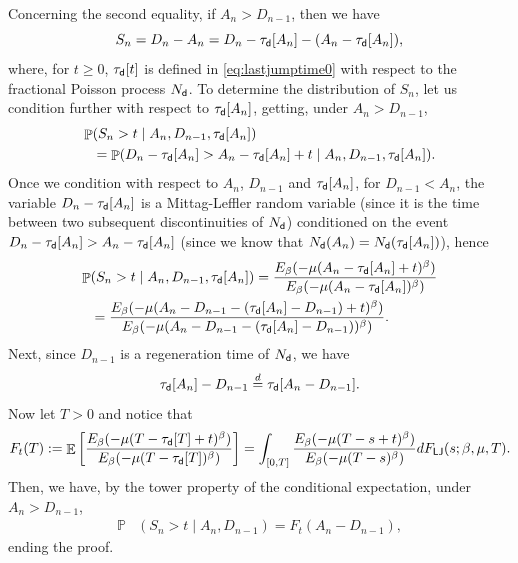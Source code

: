 \documentclass[]{amsart}
\numberwithin{equation}{section}
\theoremstyle{remark}
\theoremstyle{definition}
\DeclareMathOperator{\E}{\mathbb{E}}
\DeclareMathOperator{\N}{\mathbb{N}}
\DeclareMathOperator{\bP}{\mathbb{P}}
\begin{document}
	Concerning the second equality, if $A_n>D_{n-1}$, then we have
	\begin{equation*}
		S_n=D_n-A_n=D_n-\tau_{\sf d}[A_n]-(A_n-\tau_{\sf d}[A_n]),
	\end{equation*}
	where, for $t \ge 0$, $\tau_{\sf d}[t]$ is defined in \eqref{eq:lastjumptime0} with respect to the fractional Poisson process $N_{\sf d}$. To determine the distribution of $S_n$, let us condition further with respect to $\tau_{\sf d}[A_n]$, getting, under $A_n>D_{n-1}$, 
	\begin{align*}
		\bP&(S_n>t \mid A_n,D_{n-1},\tau_{\sf d}[A_n])\\
		&=\bP(D_n-\tau_{\sf d}[A_n]>A_n-\tau_{\sf d}[A_n]+t \mid A_n,D_{n-1},\tau_{\sf d}[A_n]).
	\end{align*}
	Once we condition with respect to $A_n$, $D_{n-1}$ and $\tau_{\sf d}[A_n]$, for $D_{n-1}<A_n$, the variable $D_n-\tau_{\sf d}[A_n]$ is a Mittag-Leffler random variable (since it is the time between two subsequent discontinuities of $N_{\sf d}$) conditioned on the event $D_n-\tau_{\sf d}[A_n]>A_n-\tau_{\sf d}[A_n]$ (since we know that $N_{\sf d}(A_n)=N_{\sf d}(\tau_{\sf d}[A_n])$), hence
	\begin{align*}
		\bP&(S_n>t \mid A_n,D_{n-1},\tau_{\sf d}[A_n])=\frac{E_\beta(-\mu(A_n-\tau_{\sf d}[A_n]+t)^\beta)}{E_\beta(-\mu(A_n-\tau_{\sf d}[A_n])^\beta)}\\
		&=\frac{E_\beta(-\mu(A_n-D_{n-1}-(\tau_{\sf d}[A_n]-D_{n-1})+t)^\beta)}{E_\beta(-\mu(A_n-D_{n-1}-(\tau_{\sf d}[A_n]-D_{n-1}))^\beta)}.
	\end{align*}
	Next, since $D_{n-1}$ is a regeneration time of $N_{\sf d}$, we have
	\begin{equation*}
		\tau_{\sf d}[A_n]-D_{n-1}\overset{d}{=}\tau_{\sf d}[A_n-D_{n-1}].
	\end{equation*}
	Now let $T>0$ and notice that
	\begin{equation*}
		F_t(T):=\E\left[\frac{E_\beta(-\mu(T-\tau_{\sf d}[T]+t)^\beta)}{E_\beta(-\mu(T-\tau_{\sf d}[T])^\beta)}\right]=\int_{[0,T]}\frac{E_\beta(-\mu(T-s+t)^\beta)}{E_\beta(-\mu(T-s)^\beta)}dF_{\sf LJ}(s;\beta,\mu,T).
	\end{equation*}
	Then, we have, by the tower property of the conditional expectation, under $A_n>D_{n-1}$,
	\begin{align*}
		\bP&(S_n>t \mid A_n,D_{n-1})=F_t(A_n-D_{n-1}),
	\end{align*}
	ending the proof.
\end{document}

